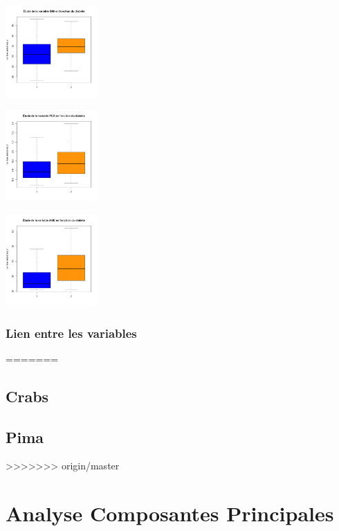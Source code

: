 \documentclass[]{report}
\begin{document}
\begin{center}
\begin{minipage}[t]{0.3\textwidth}
	\end{minipage}
	\begin{minipage}[t]{0.3\textwidth}
		\includegraphics[width=35mm]{Figures/Pima/bxp_z_bmi.png}
	\end{minipage}
	\newline
	\begin{minipage}[t]{0.3\textwidth}
		\includegraphics[width=35mm]{Figures/Pima/bxp_z_ped.png}
	\end{minipage}
	\begin{minipage}[t]{0.3\textwidth}
		\includegraphics[width=35mm]{Figures/Pima/bxp_z_age.png}
	\end{minipage}
\end{center}

\subsubsection{Lien entre les variables}

=======
\subsection{Crabs}

\subsection{Pima}
>>>>>>> origin/master

\section{Analyse Composantes Principales}
\end{document}

